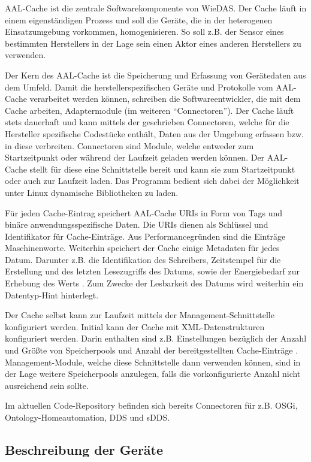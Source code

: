 AAL-Cache ist die zentrale Softwarekomponente von WieDAS.
Der Cache läuft in einem eigenständigen Prozess und soll die Geräte, die in der heterogenen Einsatzumgebung
vorkommen, homogenisieren.
So soll z.B. der Sensor eines bestimmten Herstellers in der Lage sein einen Aktor eines anderen Herstellers
zu verwenden.

Der Kern des AAL-Cache ist die Speicherung und Erfassung von Gerätedaten aus dem Umfeld.
Damit die herstellerspezifischen Geräte und Protokolle vom AAL-Cache verarbeitet werden können, schreiben
die Softwareentwickler, die mit dem Cache arbeiten, Adaptermodule (im weiteren ``Connectoren'').
Der Cache läuft stets dauerhaft und kann mittels der geschrieben Connectoren, welche für die
Hersteller spezifische Codestücke enthält, Daten aus der Umgebung erfassen bzw. in diese verbreiten.
Connectoren sind Module, welche entweder zum Startzeitpunkt oder während der Laufzeit geladen werden
können.
Der AAL-Cache stellt für diese eine Schnittstelle bereit und kann sie zum Startzeitpunkt oder auch
zur Laufzeit laden.
Das Programm bedient sich dabei der Möglichkeit unter Linux dynamische Bibliotheken zu laden.

Für jeden Cache-Eintrag speichert AAL-Cache URIs in Form von Tags und binäre anwendungsspezifische Daten.
Die URIs dienen als Schlüssel und Identifikator für Cache-Einträge.
Aus Performancegründen sind die Einträge Maschinenworte.
Weiterhin speichert der Cache einige Metadaten für jedes Datum.
Darunter z.B. die Identifikation des Schreibers, Zeitstempel für die Erstellung und des letzten
Lesezugriffs des Datums, sowie der Energiebedarf zur Erhebung des Werts \cite{aalcache}.
Zum Zwecke der Lesbarkeit des Datums wird weiterhin ein Datentyp-Hint hinterlegt.

Der Cache selbst kann zur Laufzeit mittels der Management-Schnittstelle konfiguriert werden.
Initial kann der Cache mit XML-Datenstrukturen konfiguriert werden.
Darin enthalten sind z.B. Einstellungen bezüglich der Anzahl und Größte von Speicherpools und Anzahl
der bereitgestellten Cache-Einträge \cite{aalcache}.
Management-Module, welche diese Schnittstelle dann verwenden können, sind in der Lage weitere Speicherpools
anzulegen, falls die vorkonfigurierte Anzahl nicht ausreichend sein sollte.

Im aktuellen Code-Repository befinden sich bereits Connectoren für z.B. OSGi, Ontology-Homeautomation,
DDS und sDDS.

\subsection{Beschreibung der Geräte}


